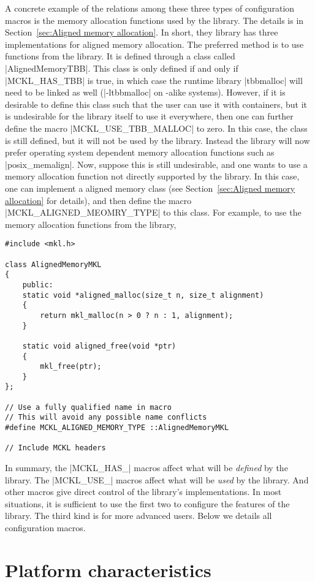 A concrete example of the relations among these three types of configuration
macros is the memory allocation functions used by the library. The details is
in Section~\ref{sec:Aligned memory allocation}. In short, they library has
three implementations for aligned memory allocation. The preferred method is to
use functions from the \tbb library. It is defined through a class called
|AlignedMemoryTBB|. This class is only defined if and only if |MCKL_HAS_TBB| is
true, in which case the runtime library |tbbmalloc| will need to be linked as
well (|-ltbbmalloc| on \unix-alike systems). However, if it is desirable to
define this class such that the user can use it with \stl containers, but it is
undesirable for the library itself to use it everywhere, then one can further
define the macro |MCKL_USE_TBB_MALLOC| to zero. In this case, the class is
still defined, but it will not be used by the library. Instead the library will
now prefer operating system dependent memory allocation functions such as
|posix_memalign|. Now, suppose this is still undesirable, and one wants to use
a memory allocation function not directly supported by the library. In this
case, one can implement a aligned memory class (see Section~\ref{sec:Aligned
memory allocation} for details), and then define the macro
|MCKL_ALIGNED_MEOMRY_TYPE| to this class. For example, to use the memory
allocation functions from the \mkl library,
\begin{Verbatim}
#include <mkl.h>

class AlignedMemoryMKL
{
    public:
    static void *aligned_malloc(size_t n, size_t alignment)
    {
        return mkl_malloc(n > 0 ? n : 1, alignment);
    }

    static void aligned_free(void *ptr)
    {
        mkl_free(ptr);
    }
};

// Use a fully qualified name in macro
// This will avoid any possible name conflicts
#define MCKL_ALIGNED_MEMORY_TYPE ::AlignedMemoryMKL

// Include MCKL headers
\end{Verbatim}
In summary, the |MCKL_HAS_| macros affect what will be \emph{defined} by the
library. The |MCKL_USE_| macros affect what will be \emph{used} by the library.
And other macros give direct control of the library's implementations. In most
situations, it is sufficient to use the first two to configure the features of
the library. The third kind is for more advanced users. Below we details all
configuration macros.

\section{Platform characteristics}
\label{sec:Platform characteristics}

